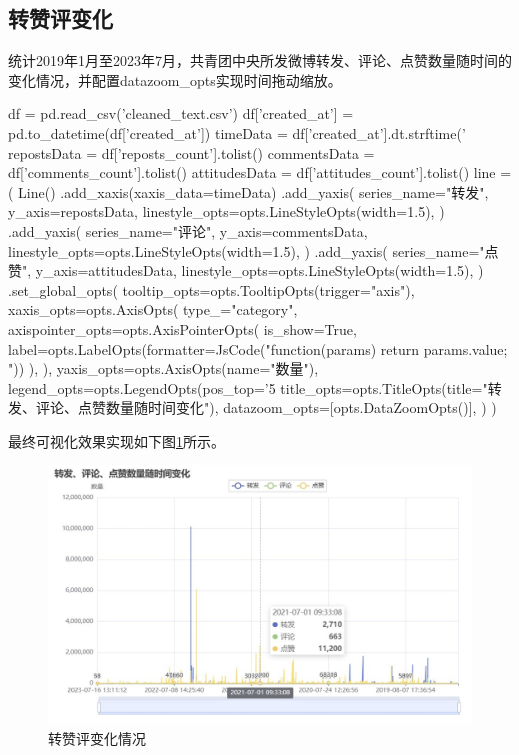 \subsection{转赞评变化}
统计2019年1月至2023年7月，共青团中央所发微博转发、评论、点赞数量随时间的变化情况，并配置datazoom\_opts实现时间拖动缩放。
\begin{python}
    df = pd.read_csv('cleaned_text.csv')
    df['created_at'] = pd.to_datetime(df['created_at'])
    timeData = df['created_at'].dt.strftime('%
    repostsData = df['reposts_count'].tolist()
    commentsData = df['comments_count'].tolist()
    attitudesData = df['attitudes_count'].tolist()
    line = (
        Line()
        .add_xaxis(xaxis_data=timeData)
        .add_yaxis(
            series_name="转发",
            y_axis=repostsData,
            linestyle_opts=opts.LineStyleOpts(width=1.5),
        )
        .add_yaxis(
            series_name="评论",
            y_axis=commentsData,
            linestyle_opts=opts.LineStyleOpts(width=1.5),
        )
        .add_yaxis(
            series_name="点赞",
            y_axis=attitudesData,
            linestyle_opts=opts.LineStyleOpts(width=1.5),
        )
        .set_global_opts(
            tooltip_opts=opts.TooltipOpts(trigger="axis"),
            xaxis_opts=opts.AxisOpts(
                type_="category",
                axispointer_opts=opts.AxisPointerOpts(
                    is_show=True, label=opts.LabelOpts(formatter=JsCode("function(params) {return params.value; }"))
                ),
            ),
            yaxis_opts=opts.AxisOpts(name="数量"),
            legend_opts=opts.LegendOpts(pos_top='5%
            title_opts=opts.TitleOpts(title="转发、评论、点赞数量随时间变化"),
            datazoom_opts=[opts.DataZoomOpts()],
        )
    )
\end{python}
\par{最终可视化效果实现如下图\ref{fig:3items}所示。}
\begin{figure}[H]
    \centering
    \includegraphics[width=12cm]{figure/3items.jpg}
    \caption{转赞评变化情况} \label{fig:3items}
\end{figure} 
